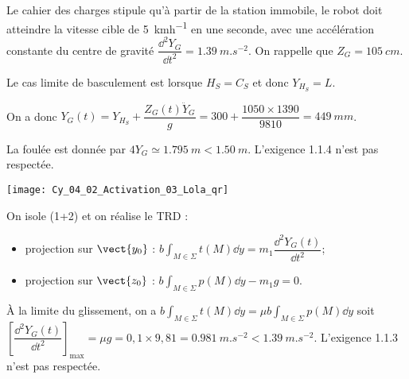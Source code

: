 Le cahier des charges stipule qu'à partir de la station immobile, le robot doit atteindre la vitesse cible de \SI{5}{kmh^{-1}} en une seconde, avec une accélération constante du centre de gravité $\dfrac{\dd^2 Y_G}{\dd t^2}=\SI{1,39}{m.s^{-2}}$.
On rappelle que $Z_G=\SI{105}{cm}$.

\fi


\ifprof
\begin{corrige}
Le cas limite de basculement est lorsque $H_S=C_S$ et donc $Y_{H_S}=L$. 

On a donc $Y_G(t) = Y_{H_S} + \dfrac{ Z_G(t) \ddot{Y}_G}{g} = 300+\dfrac{1050\times1390}{9 810} = \SI{449}{mm} $.

La foulée est donnée par $4Y_G\simeq  \SI{1,795}{m}<\SI{1,50}{m}$. L'exigence 1.1.4 n'est pas respectée.
\end{corrige}
\else
\fi


\ifprof
\else
\begin{marginfigure}
\centering
\texttt{[image: Cy\_04\_02\_Activation\_03\_Lola\_qr]}
\end{marginfigure}
\fi

\ifprof
\begin{corrige}

On isole (1+2) et on réalise le TRD :
\begin{itemize}
\item projection sur $\vect{y_0}$ : $b\int_{M\in\Sigma}t(M) \dd y= m_1 \dfrac{\dd^2 Y_G(t)}{\dd t^2}$;

\item projection sur $\vect{z_0}$ : $b\int_{M\in\Sigma}p(M) \dd y - m_1 g  = 0$.
\end{itemize}

À la limite du glissement, on a $b\int_{M\in\Sigma}t(M) \dd y= \mu b\int_{M\in\Sigma}p(M) \dd y$ soit 
$\left[\dfrac{\dd^2 Y_G(t)}{\dd t^2}\right]_{\text{max}} = \mu  g = 0,1\times 9,81 = \SI{0,981}{m.s^{-2}} < \SI{1,39}{m.s^{-2}}$. L'exigence 1.1.3 n'est pas respectée. 
\end{corrige}
\else
\fi

